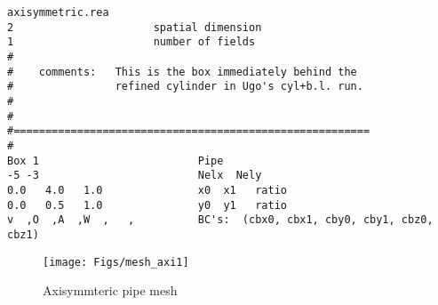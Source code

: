 \begin{verbatim}
axisymmetric.rea
2                      spatial dimension
1                      number of fields
#
#    comments:   This is the box immediately behind the 
#                refined cylinder in Ugo's cyl+b.l. run.
#
#
#========================================================
#
Box 1                         Pipe
-5 -3                         Nelx  Nely
0.0   4.0   1.0               x0  x1   ratio
0.0   0.5   1.0               y0  y1   ratio
v  ,O  ,A  ,W  ,   ,          BC's:  (cbx0, cbx1, cby0, cby1, cbz0, cbz1)
\end{verbatim}
\begin{figure}
  \centering
  \texttt{[image: Figs/mesh\_axi1]}
  \caption{Axisymmteric pipe mesh}
  \label{fig:mesh_axi1}
\end{figure}
\noindent
